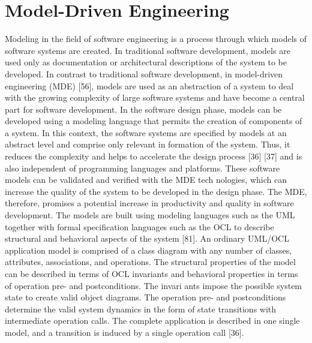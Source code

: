 \section{Model-Driven Engineering}

Modeling in the field of software engineering is a process through which models of
 software systems are created. In traditional software development, models are used
 only as documentation or architectural descriptions of the system to be developed. In
 contrast to traditional software development, in model-driven engineering (MDE) [56],
 models are used as an abstraction of a system to deal with the growing complexity
 of large software systems and have become a central part for software development.
 In the software design phase, models can be developed using a modeling language
 that permits the creation of components of a system. In this context, the software
 systems are specified by models at an abstract level and comprise only relevant in
formation of the system. Thus, it reduces the complexity and helps to accelerate
 the design process [36] [37] and is also independent of programming languages and
 platforms. These software models can be validated and verified with the MDE tech
nologies, which can increase the quality of the system to be developed in the design
 phase. The MDE, therefore, promises a potential increase in productivity and quality
 in software development.
 The models are built using modeling languages such as the UML together with
 formal specification languages such as the OCL to describe structural and behavioral
 aspects of the system [81]. An ordinary UML/OCL application model is comprised of
 a class diagram with any number of classes, attributes, associations, and operations.
 The structural properties of the model can be described in terms of OCL invariants
 and behavioral properties in terms of operation pre- and postconditions. The invari
ants impose the possible system state to create valid object diagrams. The operation
 pre- and postconditions determine the valid system dynamics in the form of state
 transitions with intermediate operation calls. The complete application is described
 in one single model, and a transition is induced by a single operation call [36].